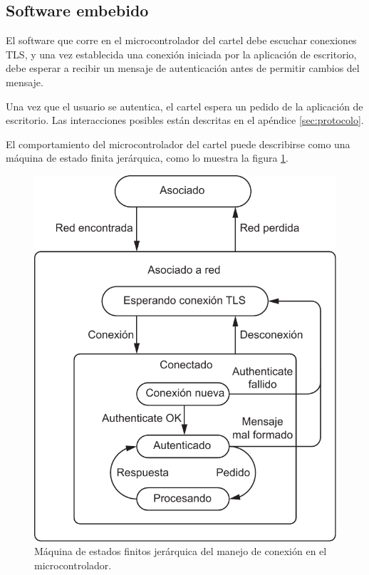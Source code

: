 \subsection{Software embebido}
El software que corre en el microcontrolador del cartel debe escuchar conexiones TLS, y una vez establecida una conexión iniciada por la aplicación de escritorio, debe esperar a recibir un mensaje de autenticación antes de permitir cambios del mensaje.

Una vez que el usuario se autentica, el cartel espera un pedido de la aplicación de escritorio. Las interacciones posibles están descritas en el apéndice \ref{sec:protocolo}.

El comportamiento del microcontrolador del cartel puede describirse como una máquina de estado finita jerárquica, como lo muestra la figura \ref{fig:fsm-micro}.

\begin{figure}[ht!]
	\begin{center}
		\centering
		\includegraphics[scale=0.8]{imagenes/fsm-micro.pdf}
		\caption{Máquina de estados finitos jerárquica del manejo de conexión en el microcontrolador.}
		\label{fig:fsm-micro}
	\end{center}
\end{figure}

